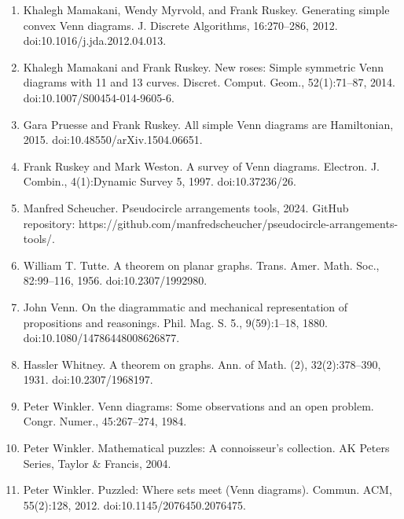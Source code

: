 \begin{enumerate}
\item[]  [12]  Khalegh Mamakani, Wendy Myrvold, and Frank Ruskey.  Generating simple convex Venn diagrams.  J. Discrete Algorithms, 16:270–286, 2012.  doi:10.1016/j.jda.2012.04.013.  
\item[]  [13]  Khalegh Mamakani and Frank Ruskey.  New roses: Simple symmetric Venn diagrams with 11 and 13 curves.  Discret. Comput. Geom., 52(1):71–87, 2014.  doi:10.1007/S00454-014-9605-6.  
\item[]  [14]  Gara Pruesse and Frank Ruskey.  All simple Venn diagrams are Hamiltonian, 2015.  doi:10.48550/arXiv.1504.06651.  
\item[]  [15]  Frank Ruskey and Mark Weston.  A survey of Venn diagrams.  Electron. J. Combin., 4(1):Dynamic Survey 5, 1997.  doi:10.37236/26.  
\item[]  [16]  Manfred Scheucher.  Pseudocircle arrangements tools, 2024.  GitHub repository: https://github.com/manfredscheucher/pseudocircle-arrangements-tools/.  
\item[]  [17]  William T. Tutte.  A theorem on planar graphs.  Trans. Amer. Math. Soc., 82:99–116, 1956.  doi:10.2307/1992980.  
\item[]  [18]  John Venn.  On the diagrammatic and mechanical representation of propositions and reasonings.  Phil. Mag. S. 5., 9(59):1–18, 1880.  doi:10.1080/14786448008626877.  
\item[]  [19]  Hassler Whitney.  A theorem on graphs.  Ann. of Math. (2), 32(2):378–390, 1931.  doi:10.2307/1968197.  
\item[]  [20]  Peter Winkler.  Venn diagrams: Some observations and an open problem.  Congr. Numer., 45:267–274, 1984.  
\item[]  [21]  Peter Winkler.  Mathematical puzzles: A connoisseur’s collection.  AK Peters Series, Taylor \& Francis, 2004.  
\item[]  [22]  Peter Winkler.  Puzzled: Where sets meet (Venn diagrams).  Commun. ACM, 55(2):128, 2012.  doi:10.1145/2076450.2076475.  
\end{enumerate}

